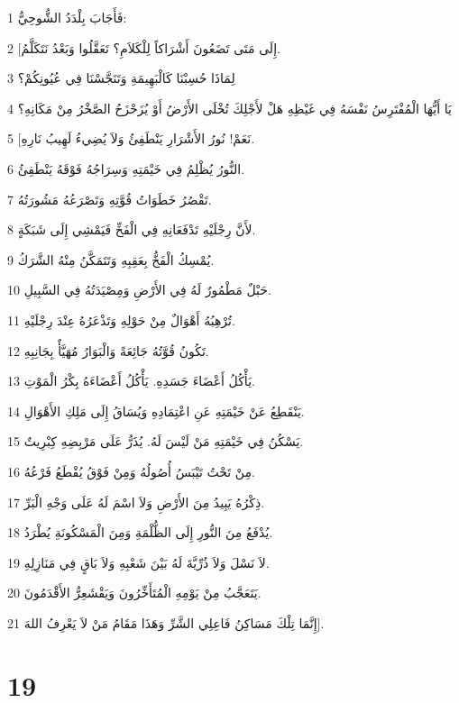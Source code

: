\par 1 فَأَجَابَ بِلْدَدُ الشُّوحِيُّ:
\par 2 [إِلَى مَتَى تَضَعُونَ أَشْرَاكاً لِلْكَلاَمِ؟ تَعَقَّلُوا وَبَعْدُ نَتَكَلَّمُ.
\par 3 لِمَاذَا حُسِبْنَا كَالْبَهِيمَةِ وَتَنَجَّسْنَا فِي عُيُونِكُمْ؟
\par 4 يَا أَيُّهَا الْمُفْتَرِسُ نَفْسَهُ فِي غَيْظِهِ هَلْ لأَجْلِكَ تُخْلَى الأَرْضُ أَوْ يُزَحْزَحُ الصَّخْرُ مِنْ مَكَانِهِ؟
\par 5 [نَعَمْ! نُورُ الأَشْرَارِ يَنْطَفِئُ وَلاَ يُضِيءُ لَهِيبُ نَارِهِ.
\par 6 النُّورُ يُظْلِمُ فِي خَيْمَتِهِ وَسِرَاجُهُ فَوْقَهُ يَنْطَفِئُ.
\par 7 تَقْصُرُ خَطَوَاتُ قُوَّتِهِ وَتَصْرَعُهُ مَشُورَتُهُ.
\par 8 لأَنَّ رِجْلَيْهِ تَدْفَعَانِهِ فِي الْفَخِّ فَيَمْشِي إِلَى شَبَكَةٍ.
\par 9 يُمْسِكُ الْفَخُّ بِعَقِبِهِ وَتَتَمَكَّنُ مِنْهُ الشَّرَكُ.
\par 10 حَبْلٌ مَطْمُورٌ لَهُ فِي الأَرْضِ وَمِصْيَدَتُهُ فِي السَّبِيلِ.
\par 11 تُرْهِبُهُ أَهْوَالٌ مِنْ حَوْلِهِ وَتَذْعَرُهُ عِنْدَ رِجْلَيْهِ.
\par 12 تَكُونُ قُوَّتُهُ جَائِعَةً وَالْبَوَارُ مُهَيَّأٌ بِجَانِبِهِ.
\par 13 يَأْكُلُ أَعْضَاءَ جَسَدِهِ. يَأْكُلُ أَعْضَاءَهُ بِكْرُ الْمَوْتِ.
\par 14 يَنْقَطِعُ عَنْ خَيْمَتِهِ عَنِ اعْتِمَادِهِ وَيُسَاقُ إِلَى مَلِكِ الأَهْوَالِ.
\par 15 يَسْكُنُ فِي خَيْمَتِهِ مَنْ لَيْسَ لَهُ. يُذَرُّ عَلَى مَرْبِضِهِ كِبْرِيتٌ.
\par 16 مِنْ تَحْتُ تَيْبَسُ أُصُولُهُ وَمِنْ فَوْقُ يُقْطَعُ فَرْعُهُ.
\par 17 ذِكْرُهُ يَبِيدُ مِنَ الأَرْضِ وَلاَ اسْمَ لَهُ عَلَى وَجْهِ الْبَرِّ.
\par 18 يُدْفَعُ مِنَ النُّورِ إِلَى الظُّلْمَةِ وَمِنَ الْمَسْكُونَةِ يُطْرَدُ.
\par 19 لاَ نَسْلَ وَلاَ ذُرِّيَّةَ لَهُ بَيْنَ شَعْبِهِ وَلاَ بَاقٍ فِي مَنَازِلِهِ.
\par 20 يَتَعَجَّبُ مِنْ يَوْمِهِ الْمُتَأَخِّرُونَ وَيَقْشَعِرُّ الأَقْدَمُونَ.
\par 21 إِنَّمَا تِلْكَ مَسَاكِنُ فَاعِلِي الشَّرِّ وَهَذَا مَقَامُ مَنْ لاَ يَعْرِفُ اللهَ].

\chapter{19}

